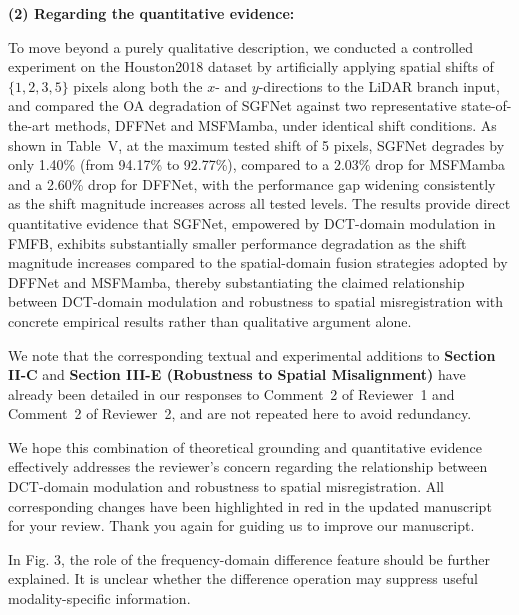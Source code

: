 \textbf{(2) Regarding the quantitative evidence:}

To move beyond a purely qualitative description, we conducted a controlled experiment on the Houston2018 dataset by artificially applying spatial shifts of $\{1, 2, 3, 5\}$ pixels along both the $x$- and $y$-directions to the LiDAR branch input, and compared the OA degradation of SGFNet against two representative state-of-the-art methods, DFFNet and MSFMamba, under identical shift conditions. As shown in Table~V, at the maximum tested shift of 5 pixels, SGFNet degrades by only 1.40\% (from 94.17\% to 92.77\%), compared to a 2.03\% drop for MSFMamba and a 2.60\% drop for DFFNet, with the performance gap widening consistently as the shift magnitude increases across all tested levels. The results provide direct quantitative evidence that SGFNet, empowered by DCT-domain modulation in FMFB, exhibits substantially smaller performance degradation as the shift magnitude increases compared to the spatial-domain fusion strategies adopted by DFFNet and MSFMamba, thereby substantiating the claimed relationship between DCT-domain modulation and robustness to spatial misregistration with concrete empirical results rather than qualitative argument alone.

We note that the corresponding textual and experimental additions to \textbf{Section II-C} and \textbf{Section III-E (Robustness to Spatial Misalignment)} have already been detailed in our responses to Comment~2 of Reviewer~1 and Comment~2 of Reviewer~2, and are not repeated here to avoid redundancy.

We hope this combination of theoretical grounding and quantitative evidence effectively addresses the reviewer's concern regarding the relationship between DCT-domain modulation and robustness to spatial misregistration. All corresponding changes have been highlighted in red in the updated manuscript for your review. Thank you again for guiding us to improve our manuscript.

\vspace{2em}

\begin{tcolorbox}[title={Reviewer \#3, Comment \#5}] 
  \vspace{1em}
  
  \color{blue}
  In Fig. 3, the role of the frequency-domain difference feature should be further explained. It is unclear whether the difference operation may suppress useful modality-specific information.

  \vspace{1em}
\end{tcolorbox}

